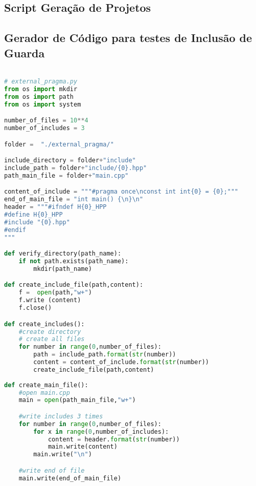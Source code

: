 \begin{apendicesenv}

\partapendices

\chapter{Script Geração de Projetos}

\section{Gerador de Código para testes de Inclusão de Guarda}

\begin{lstlisting}[language=Python, caption={
     Script Guardas de Inclusão Externa mais pragma once},
                  label=script_external_pragma_include]

# external_pragma.py
from os import mkdir
from os import path
from os import system

number_of_files = 10**4
number_of_includes = 3

folder =  "./external_pragma/"

include_directory = folder+"include"
include_path = folder+"include/{0}.hpp"
path_main_file = folder+"main.cpp"

content_of_include = """#pragma once\nconst int int{0} = {0};"""
end_of_main_file = "int main() {\n}\n"
header = """#ifndef H{0}_HPP
#define H{0}_HPP
#include "{0}.hpp"
#endif
"""

def verify_directory(path_name):
    if not path.exists(path_name):
        mkdir(path_name)

def create_include_file(path,content):
    f =  open(path,"w+")
    f.write (content)
    f.close()

def create_includes():
    #create directory
    # create all files
    for number in range(0,number_of_files):
        path = include_path.format(str(number))
        content = content_of_include.format(str(number))
        create_include_file(path,content)
    
def create_main_file():
    #open main.cpp
    main = open(path_main_file,"w+")

    #write includes 3 times
    for number in range(0,number_of_files):
        for x in range(0,number_of_includes):
            content = header.format(str(number))
            main.write(content)
        main.write("\n")

    #write end of file
    main.write(end_of_main_file)


\end{lstlisting}
\end{apendicesenv}
